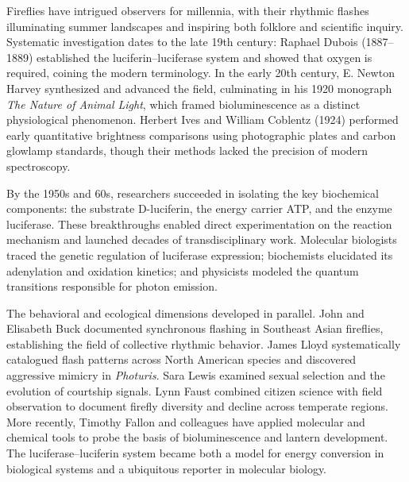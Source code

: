 \begin{historical}
Fireflies have intrigued observers for millennia, with their rhythmic flashes illuminating summer landscapes and inspiring both folklore and scientific inquiry. Systematic investigation dates to the late 19th century: Raphael Dubois (1887–1889) established the luciferin–luciferase system and showed that oxygen is required, coining the modern terminology. In the early 20th century, E. Newton Harvey synthesized and advanced the field, culminating in his 1920 monograph \emph{The Nature of Animal Light}, which framed bioluminescence as a distinct physiological phenomenon. Herbert Ives and William Coblentz (1924) performed early quantitative brightness comparisons using photographic plates and carbon glowlamp standards, though their methods lacked the precision of modern spectroscopy.

By the 1950s and 60s, researchers succeeded in isolating the key biochemical components: the substrate D-luciferin, the energy carrier ATP, and the enzyme luciferase. These breakthroughs enabled direct experimentation on the reaction mechanism and launched decades of transdisciplinary work. Molecular biologists traced the genetic regulation of luciferase expression; biochemists elucidated its adenylation and oxidation kinetics; and physicists modeled the quantum transitions responsible for photon emission.

The behavioral and ecological dimensions developed in parallel. John and Elisabeth Buck documented synchronous flashing in Southeast Asian fireflies, establishing the field of collective rhythmic behavior. James Lloyd systematically catalogued flash patterns across North American species and discovered aggressive mimicry in \emph{Photuris}. Sara Lewis examined sexual selection and the evolution of courtship signals. Lynn Faust combined citizen science with field observation to document firefly diversity and decline across temperate regions. More recently, Timothy Fallon and colleagues have applied molecular and chemical tools to probe the basis of bioluminescence and lantern development. The luciferase–luciferin system became both a model for energy conversion in biological systems and a ubiquitous reporter in molecular biology.
\end{historical}


